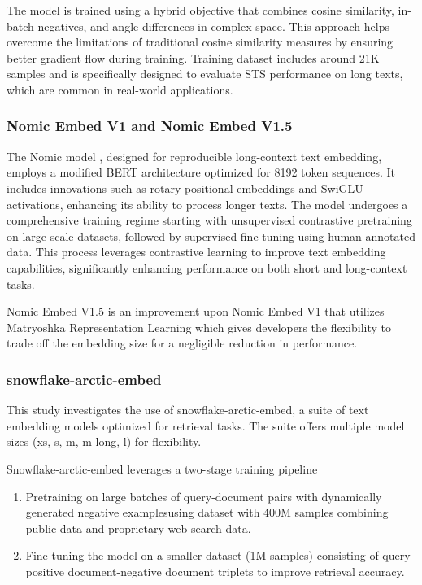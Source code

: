 The model is trained using a hybrid objective that combines cosine similarity, in-batch negatives, and angle differences in complex space.
This approach helps overcome the limitations of traditional cosine similarity measures by ensuring better gradient flow during training.
Training dataset includes around 21K samples and is specifically designed to evaluate \ac{STS} performance on long texts, which are common in real-world applications.

\subsubsection{Nomic Embed V1 and Nomic Embed V1.5}
The Nomic model \cite{nussbaum2024nomic}, designed for reproducible long-context text embedding, employs a modified BERT architecture optimized for 8192 token sequences.
It includes innovations such as rotary positional embeddings and SwiGLU activations, enhancing its ability to process longer texts.
The model undergoes a comprehensive training regime starting with unsupervised contrastive pretraining on large-scale datasets, followed by supervised fine-tuning using human-annotated data.
This process leverages contrastive learning to improve text embedding capabilities, significantly enhancing performance on both short and long-context tasks.

Nomic Embed V1.5 is an improvement upon Nomic Embed V1 that utilizes Matryoshka Representation Learning \cite{kusupati2024matryoshka} which gives developers the flexibility to trade off the embedding size for a negligible reduction in performance.

\subsubsection{snowflake-arctic-embed}
This study investigates the use of snowflake-arctic-embed, a suite of text embedding models optimized for retrieval tasks. The suite offers multiple model sizes (xs, s, m, m-long, l) for flexibility.

Snowflake-arctic-embed leverages a two-stage training pipeline
\begin{enumerate}
  \item Pretraining on large batches of query-document pairs with dynamically generated negative examplesusing dataset with 400M samples combining public data and proprietary web search data.
  \item Fine-tuning the model on a smaller dataset (1M samples) consisting of query-positive document-negative document triplets to improve retrieval accuracy.
\end{enumerate}

